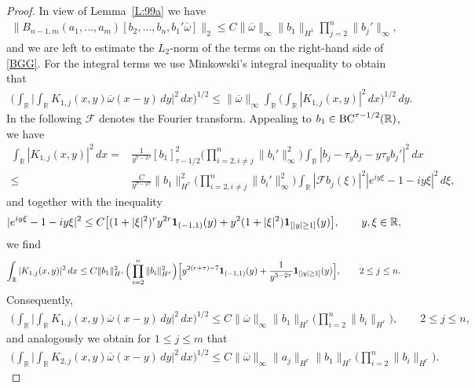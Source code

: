 \documentclass[11pt,reqno]{amsart}
\numberwithin{equation}{section}
\newcommand{\0}{\Omega}
\newcommand{\ov}{\overline}
\newcommand{\oo}{\ov\omega}
\newcommand{\kF}{\mathcal{F}}
\newcommand{\R}{\mathbb{R}}
\numberwithin{equation}{section}
\begin{document}
\begin{proof}
In view of Lemma~\ref{L:99a} we have 
\begin{align}\label{BGG0}
 \|B_{n-1,m}(a_1,\ldots, a_{m})[b_2,\ldots, b_n,b_1'\oo]\|_2\leq C\|\oo\|_\infty\|b_1\|_{H^1}\prod_{j=2}^n\|b_j'\|_\infty,
\end{align}
and we are left to estimate the $L_2$-norm of the terms on  the right-hand side of \eqref{BGG}.
For the integral terms we use
Minkowski's  integral inequality to obtain that
\begin{align*}
\Big(\int_\R\Big|\int_\R K_{1,j}(x,y)\oo(x-y)\, dy\Big|^2\, dx\Big)^{1/2}\leq  \|\oo\|_{\infty}\int_\R\Big(\int_\R |K_{1,j}(x,y)|^2\, dx\Big)^{1/2}\, dy.
\end{align*}
In the following $\kF$ denotes the Fourier transform.
Appealing to  $b_1\in{\rm BC}^{\tau-1/2}(\R)$, we  have 
\begin{align*}
 \int_\R |K_{1,j}(x,y)|^2\, dx =&\frac{1 }{y^{7-2\tau}} [b_1]_{\tau-1/2}^2\Big(\prod_{i=2, i\neq j}^{n}\|b_i'\|_{\infty}^2\Big)\int_\R|b_j-\tau_y b_j-y\tau_y b_j'|^2\, dx\\[1ex]
 \leq& \frac{C }{y^{7-2\tau}} \|b_1\|_{H^{\tau}}^2\Big(\prod_{i=2, i\neq j}^{n}\|b_i'\|_{\infty}^2\Big)\int_\R|\mathcal{F} b_j(\xi)|^2|e^{iy\xi}-1-iy\xi|^2\, d\xi,
\end{align*}
and together with the  inequality 
\begin{align*}
|e^{iy\xi}-1-iy\xi|^2\leq  C\big[(1+|\xi|^2)^ry^{2r} {\bf 1}_{(-1,1)}(y)+y^2(1+|\xi|^2) {\bf 1}_{[|y|\geq1]}(y)\big],\qquad y,\xi\in\R,
\end{align*}
we find   
\[
\int_\R |K_{1,j}(x,y)|^2\, dx\leq C \|b_1\|_{H^{\tau}}^2 \Big(\prod_{i=2}^{n}\|b_i\|_{H^r}^2\Big) \Big[y^{2(r+\tau)-7} {\bf 1}_{(-1,1)}(y)+ \frac{1}{y^{5-2\tau}} {\bf 1}_{[|y|\geq1]}(y)\Big],\qquad 2\leq j\leq n.
\]
Consequently, 
\begin{align}\label{BGG2}
\Big(\int_\R\Big|\int_\R K_{1,j}(x,y)\oo(x-y)\, dy\Big|^2\, dx\Big)^{1/2}\leq C\|\oo\|_\infty \|b_1\|_{H^{\tau}} \Big(\prod_{i=2}^{n}\|b_i\|_{H^r}\Big),\qquad 2\leq j\leq n,
\end{align} 
and analogously we obtain for $ 1\leq j\leq m$ that
\begin{align}\label{BGG3}
\Big(\int_\R\Big|\int_\R K_{2,j}(x,y)\oo(x-y)\, dy\Big|^2\, dx\Big)^{1/2}\leq   C\|\oo\|_\infty\|a_j\|_{H^r} \|b_1\|_{H^{\tau}} \Big(\prod_{i=2}^{n}\|b_i\|_{H^r}\Big).
\end{align}


\end{proof}
\end{document}
